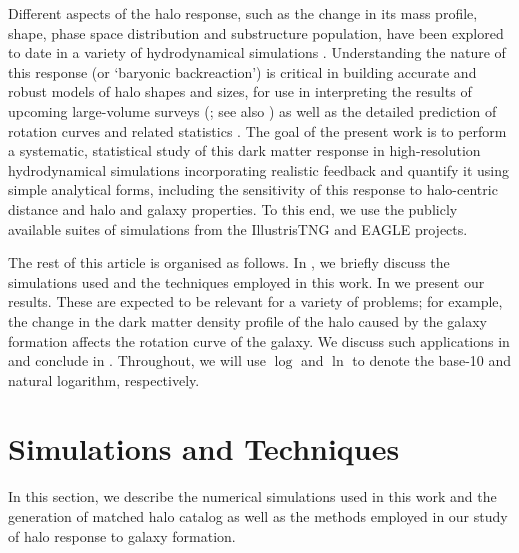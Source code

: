 Different aspects of the halo response, such as the change in its mass profile, shape, phase space distribution and substructure population, have been explored to date in a variety of hydrodynamical simulations \citep[see, e.g.,][]{2004ApJ...611L..73K,2008ApJ...681.1076D,2014MNRAS.441.2986D,2015MNRAS.451.1247S,2017MNRAS.466.3876Z,2017MNRAS.472.4343C,2019MNRAS.484..476C,2021arXiv210900012C,2021MNRAS.501.5679C,2020MNRAS.494.4291C,freundlich+20,riggs+22}.
Understanding the nature of this response (or `baryonic backreaction') is critical in building accurate and robust models of halo shapes and sizes, for use in interpreting the results of upcoming large-volume surveys (\citealp{2015JCAP...12..049S,2018MNRAS.480.3962C,2021MNRAS.503.3596A}; see also \citealp{velliscig+14,hwvh15,mead+15}) as well as the detailed prediction of rotation curves and related statistics \citep{2021MNRAS.507..632P,2021arXiv211200026P}.
The goal of the present work is to perform a systematic, statistical study of this dark matter response in high-resolution hydrodynamical simulations incorporating realistic feedback and quantify it using simple analytical forms, including the sensitivity of this response to halo-centric distance and halo and galaxy properties. To this end, we use the publicly available suites of simulations from the IllustrisTNG and EAGLE projects. 


The rest of this article is organised as follows.
In , we briefly discuss the simulations used and the techniques employed in this work. In  we present our results. These are expected to be relevant for a variety of problems; for example, the change in the dark matter density profile of the halo caused by the galaxy formation affects the rotation curve of the galaxy.
We discuss such applications in  and conclude in . 
Throughout, we will use $\log$ and $\ln$ to denote the base-10 and natural logarithm, respectively.











\section{Simulations and Techniques}
\label{sec:sim-and-teq-ch:simbase}
In this section, we describe the numerical simulations used in this work and the generation of matched halo catalog as well as the methods employed in our study of halo response to galaxy formation.

